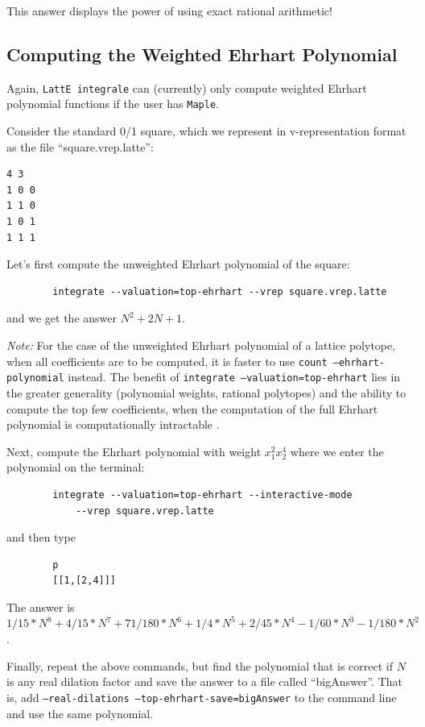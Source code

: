 \documentclass{article}
\newcommand{\latteInt}{{\tt LattE integrale}\xspace}
\newcommand{\maple}{{\tt Maple}\xspace}
\begin{document}
This answer displays the power of using exact rational arithmetic!      



\subsection{Computing the Weighted Ehrhart Polynomial}

Again, \latteInt can (currently) only compute weighted Ehrhart polynomial
functions 
if 
the user has \maple.

Consider the standard 0/1 square, which we represent in v-representation format as the
file ``square.vrep.latte'':
\begin{verbatim}
4 3
1 0 0
1 1 0
1 0 1
1 1 1
\end{verbatim}
Let's first compute the unweighted Ehrhart polynomial of the square:
        \begin{verbatim}
        integrate --valuation=top-ehrhart --vrep square.vrep.latte 
        \end{verbatim}
and we get the answer $N^2 + 2N + 1$. 

\emph{Note:} For the case of the unweighted Ehrhart polynomial of a lattice polytope,
when all coefficients are to be computed, it is faster to use \texttt{count
  --ehrhart-polynomial} instead.  The benefit of \texttt{integrate
  --valuation=top-ehrhart} lies in the greater generality (polynomial weights,
rational polytopes) and the ability to compute the top few coefficients, when
the computation of the full Ehrhart polynomial is computationally intractable
\cite{so-called-paper-1}. 


Next, compute the Ehrhart polynomial with weight $x_1^2x_2^4$ where we enter
the polynomial on the terminal:
        \begin{verbatim}
        integrate --valuation=top-ehrhart --interactive-mode 
            --vrep square.vrep.latte 
        \end{verbatim}
and then type
        \begin{verbatim}
        p
        [[1,[2,4]]]
        \end{verbatim}
The answer is $1/15*N^8+4/15*N^7+71/180*N^6+1/4*N^5+2/45*N^4-1/60*N^3-1/180*N^2$.

Finally, repeat the above commands, but find the polynomial that is correct if
$N$ is any real dilation factor and save the answer to a file called
``bigAnswer''. That is, add \texttt{--real-dilations
  --top-ehrhart-save=bigAnswer} to the command line and use the same
polynomial.  
\end{document}
